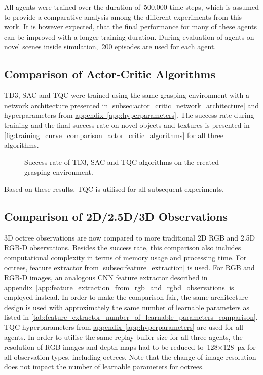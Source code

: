 All agents were trained over the duration of~500,000 time steps, which is assumed to provide a comparative analysis among the different experiments from this work. It is however expected, that the final performance for many of these agents can be improved with a longer training duration. During evaluation of agents on novel scenes inside simulation,~200 episodes are used for each agent.


\subsection{Comparison of Actor-Critic Algorithms}

TD3, SAC and TQC were trained using the same grasping environment with a network architecture presented in \autoref{subsec:actor_critic_network_architecture} and hyperparameters from \hyperref[app:hyperparameters]{appendix~\ref*{app:hyperparameters}}. The success rate during training and the final success rate on novel objects and textures is presented in \autoref{fig:training_curve_comparison_actor_critic_algorithms} for all three algorithms.

\begin{figure}[ht]
    \centering
    \caption{Success rate of TD3, SAC and TQC algorithms on the created grasping environment.}
    \label{fig:training_curve_comparison_actor_critic_algorithms}
\end{figure}

Based on these results, TQC is utilised for all subsequent experiments.


\subsection{Comparison of 2D/2.5D/3D Observations}\label{subsec:comparison_of_2d_2_5d_3d_observations}

3D octree observations are now compared to more traditional 2D RGB and 2.5D RGB-D observations. Besides the success rate, this comparison also includes computational complexity in terms of memory usage and processing time. For octrees, feature extractor from \autoref{subsec:feature_extraction} is used. For RGB and RGB-D images, an analogous CNN feature extractor described in \hyperref[app:feature_extraction_from_rgb_and_rgbd_observations]{appendix~\ref*{app:feature_extraction_from_rgb_and_rgbd_observations}} is employed instead.  In order to make the comparison fair, the same architecture design is used with approximately the same number of learnable parameters as listed in \autoref{tab:feature_extractor_number_of_learnable_parameters_comparison}. TQC hyperparameters from \hyperref[app:hyperparameters]{appendix~\ref*{app:hyperparameters}} are used for all agents. In order to utilise the same replay buffer size for all three agents, the resolution of RGB images and depth maps had to be reduced to~128\({\times}\)128~px for all observation types, including octrees. Note that the change of image resolution does not impact the number of learnable parameters for octrees.

